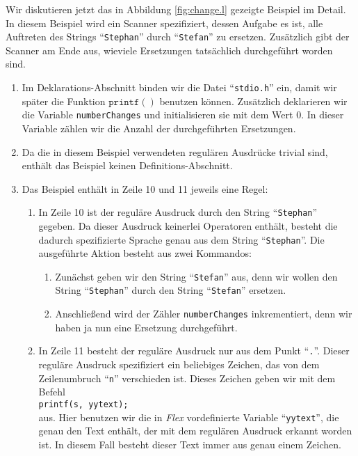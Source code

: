 Wir diskutieren jetzt das in Abbildung \ref{fig:change.l} gezeigte Beispiel im Detail.
In diesem Beispiel wird ein Scanner spezifiziert, dessen Aufgabe es ist, alle Auftreten des
Strings ``\texttt{Stephan}'' durch ``\texttt{Stefan}'' zu ersetzen.  Zus\"atzlich
gibt der Scanner am Ende aus, wieviele Ersetzungen tats\"achlich durchgef\"uhrt worden sind.
\begin{enumerate}
\item Im Deklarations-Abschnitt binden wir die Datei ``\texttt{stdio.h}'' ein, damit wir sp\"ater
      die Funktion $\texttt{printf}()$ benutzen k\"onnen.
      Zus\"atzlich deklarieren wir die Variable \texttt{numberChanges} und initialisieren
      sie mit dem Wert 0.  In dieser Variable z\"ahlen wir die Anzahl der durchgef\"uhrten
      Ersetzungen.  
\item Da die in diesem Beispiel verwendeten regul\"aren Ausdr\"ucke trivial sind,
      enth\"alt das Beispiel keinen Definitions-Abschnitt.
\item Das Beispiel enth\"alt in Zeile 10 und 11 jeweils eine Regel:
      \begin{enumerate}
      \item In Zeile 10 ist der regul\"are Ausdruck durch den String ``\texttt{Stephan}''
            gegeben.  Da dieser Ausdruck keinerlei Operatoren enth\"alt, besteht die dadurch
            spezifizierte Sprache genau aus dem String ``\texttt{Stephan}''.  Die
            ausgef\"uhrte Aktion besteht aus zwei Kommandos:
            \begin{enumerate}
            \item Zun\"achst geben wir den String ``\texttt{Stefan}'' aus, denn wir wollen
                  den String ``\texttt{Stephan}'' durch den String ``\texttt{Stefan}'' 
                  ersetzen.
            \item Anschlie{\ss}end wird der Z\"ahler \texttt{numberChanges} inkrementiert,
                  denn wir haben ja nun eine Ersetzung durchgef\"uhrt.
            \end{enumerate}
      \item In Zeile 11 besteht der regul\"are Ausdruck nur aus dem Punkt ``\texttt{.}''.
            Dieser regul\"are Ausdruck spezifiziert ein beliebiges Zeichen, das von dem
            Zeilenumbruch ``\texttt{n}'' verschieden ist.  Dieses Zeichen
            geben wir mit dem Befehl 
            \\[0.2cm]
            \hspace*{1.3cm}
            \texttt{printf(s, yytext);}
            \\[0.2cm]
            aus.  Hier benutzen wir die in \textsl{Flex}\/ vordefinierte Variable
            ``\texttt{yytext}'', die genau den Text enth\"alt, der mit dem regul\"aren Ausdruck
            erkannt worden ist.  In diesem Fall besteht dieser Text immer aus genau einem
            Zeichen.


\end{enumerate}
\end{enumerate}
